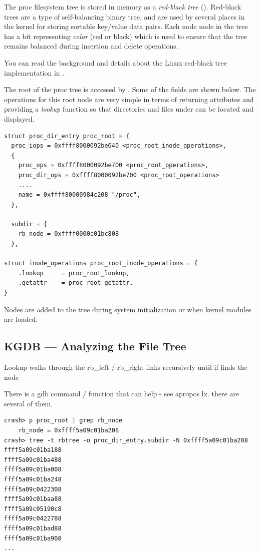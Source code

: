 The proc filesystem tree is stored in memory as a \textit{red-black tree} (). Red-black trees are a type of self-balancing binary tree, and are used by several places in the kernel for storing sortable key/value data pairs. Each node node in the tree has a bit representing \textit{color} (red or black) which is used to ensure that the tree remains balanced during insertion and delete operations.

You can read the background and details about the Linux red-black tree implementation in .


The root of the proc tree is accessed by . Some of the fields are shown below. The operations for this root node are very simple in terms of returning attributes and providing a \textit{lookup} function so that directories and files under  can be located and displayed.


\begin{lstlisting}
struct proc_dir_entry proc_root = {
  proc_iops = 0xffff8000092be640 <proc_root_inode_operations>,
  {
    proc_ops = 0xffff8000092be700 <proc_root_operations>,
    proc_dir_ops = 0xffff8000092be700 <proc_root_operations>
    ....
    name = 0xffff80000984c208 "/proc",
  },

  subdir = {
    rb_node = 0xffff0000c01bc808
  },

struct inode_operations proc_root_inode_operations = {
    .lookup     = proc_root_lookup,
    .getattr    = proc_root_getattr,
}
\end{lstlisting}

\noindent
Nodes are added to the tree during system initialization or when kernel modules are loaded.

\subsection{KGDB --- Analyzing the  File Tree}

Lookup walks through the rb\_left / rb\_right links recursively until if finds the node

There is a gdb command  / function that can help - see apropos lx. there are several of them.

\begin{lstlisting}
crash> p proc_root | grep rb_node
    rb_node = 0xffff5a09c01ba208
crash> tree -t rbtree -o proc_dir_entry.subdir -N 0xffff5a09c01ba208
ffff5a09c01ba188
ffff5a09c01ba488
ffff5a09c01ba008
ffff5a09c01ba248
ffff5a09c0422308
ffff5a09c01baa88
ffff5a09c05190c8
ffff5a09c0422788
ffff5a09c01bad88
ffff5a09c01ba908
...
\end{lstlisting}


